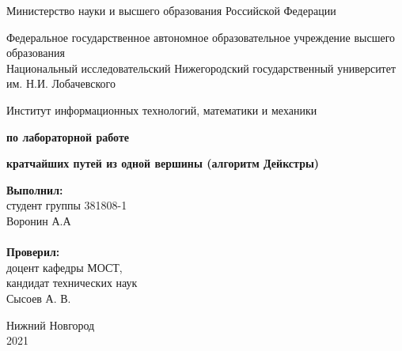 \documentclass{report}
\begin{document}
\begin{titlepage}

\begin{center}
Министерство науки и высшего образования Российской Федерации
\end{center}

\begin{center}
Федеральное государственное автономное образовательное учреждение высшего образования \\
Национальный исследовательский Нижегородский государственный университет им. Н.И. Лобачевского
\end{center}

\begin{center}
Институт информационных технологий, математики и механики
\end{center}

\vspace{4em}

\begin{center}
\textbf{ по лабораторной работе} \\
\end{center}
\begin{center}
\textbf{ кратчайших путей из одной вершины (алгоритм Дейкстры)} \\
\end{center}

\vspace{4em}

\newbox{\lbox}
\newlength{\maxl}
\setlength{\maxl}{\wd\lbox}
\hfill\parbox{7cm}{
\hspace*{5cm}\hspace*{-5cm}\textbf{Выполнил:} \\ студент группы 381808-1 \\ Воронин А.А\\
\\
\hspace*{5cm}\hspace*{-5cm}\textbf{Проверил:}\\ доцент кафедры МОСТ, \\ кандидат технических наук \\ Сысоев А. В.
}

\vspace{\fill}

\begin{center} Нижний Новгород \\ 2021 \end{center}

\end{titlepage}
\end{document}
